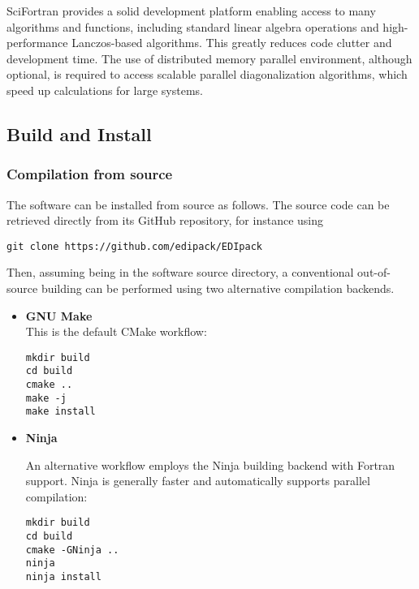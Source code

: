 \documentclass[edipack_sp.tex]{subfiles}
\begin{document}
SciFortran provides a solid development platform enabling access to
many algorithms and functions, including standard linear algebra
operations and high-performance Lanczos-based algorithms. This
greatly reduces code clutter and development time.
The use of distributed memory parallel environment, although optional,
is required to access scalable parallel diagonalization algorithms,
which speed up calculations for large systems. 

\subsection{Build and Install}\label{sSecInstallBuildInstall}
\subsubsection{Compilation from source}
The software can be installed from source as follows. The source code can
be retrieved directly from its GitHub repository, for instance using
\begin{lstlisting}[style=mybash,numbers=none]
git clone https://github.com/edipack/EDIpack 
\end{lstlisting}
Then, assuming being in the software source directory, a conventional
out-of-source building can be performed using two alternative compilation backends.

\begin{itemize}
  \item {\bf GNU Make}\\
This is the default CMake workflow:
\begin{lstlisting}[style=mybash,numbers=none]
mkdir build
cd build
cmake ..
make -j
make install
\end{lstlisting}


\item{\bf Ninja}

An alternative workflow employs the Ninja building backend with
Fortran support. Ninja is generally faster and automatically supports
parallel compilation:
\begin{lstlisting}[style=mybash,numbers=none]
mkdir build
cd build
cmake -GNinja ..
ninja
ninja install
\end{lstlisting}
\end{itemize}
\end{document}
